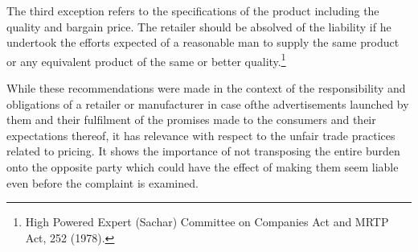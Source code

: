 \begin{multicols}{2}
\noi
The third exception refers to the specifications of the product including the quality and bargain
price. The retailer should be absolved of the liability if he undertook the efforts expected of a
reasonable man to supply the same product or any equivalent product of the same or better
quality.\footnote{High Powered Expert (Sachar) Committee on Companies Act and MRTP Act, 252 (1978).}

\noi
While these recommendations were made in the context of the responsibility and obligations of a retailer or manufacturer in case ofthe advertisements launched by them and their fulfilment of the promises made to the consumers and their expectations thereof, it has relevance with respect to the unfair trade practices related to pricing. It shows the importance of not transposing the entire burden onto the opposite party which could have the effect of making them seem liable even before the complaint is examined.



\end{multicols}
